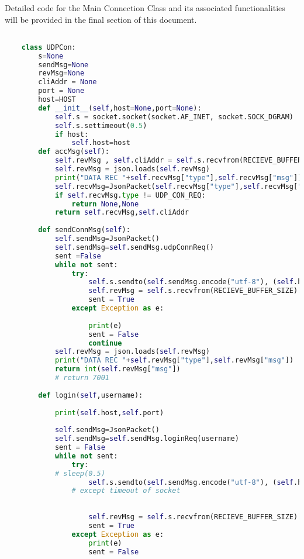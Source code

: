 Detailed code for the Main Connection Class and its associated functionalities will be provided in the final section of this document.
\begin{lstlisting}[language=Python]

    class UDPCon:
        s=None
        sendMsg=None
        revMsg=None
        cliAddr = None
        port = None
        host=HOST
        def __init__(self,host=None,port=None):
            self.s = socket.socket(socket.AF_INET, socket.SOCK_DGRAM)
            self.s.settimeout(0.5)
            if host:
                self.host=host
        def accMsg(self):
            self.revMsg , self.cliAddr = self.s.recvfrom(RECIEVE_BUFFER_SIZE)
            self.revMsg = json.loads(self.revMsg)
            print("DATA REC "+self.recvMsg["type"],self.recvMsg["msg"])
            self.recvMsg=JsonPacket(self.recvMsg["type"],self.recvMsg["msg"])
            if self.recvMsg.type != UDP_CON_REQ:
                return None,None
            return self.recvMsg,self.cliAddr
    
        def sendConnMsg(self):
            self.sendMsg=JsonPacket()
            self.sendMsg=self.sendMsg.udpConnReq()
            sent =False
            while not sent:
                try:
                    self.s.sendto(self.sendMsg.encode("utf-8"), (self.host,PORT))
                    self.revMsg = self.s.recvfrom(RECIEVE_BUFFER_SIZE)[0]
                    sent = True
                except Exception as e:
    
                    print(e)
                    sent = False
                    continue
            self.revMsg = json.loads(self.revMsg)
            print("DATA REC "+self.revMsg["type"],self.revMsg["msg"])
            return int(self.revMsg["msg"])
            # return 7001
    
        def login(self,username):
            
            print(self.host,self.port)
    
            self.sendMsg=JsonPacket()
            self.sendMsg=self.sendMsg.loginReq(username)
            sent = False
            while not sent:
                try:
            # sleep(0.5)
                    self.s.sendto(self.sendMsg.encode("utf-8"), (self.host,self.port))
                # except timeout of socket
                    
            
                    self.revMsg = self.s.recvfrom(RECIEVE_BUFFER_SIZE)[0]
                    sent = True
                except Exception as e:
                    print(e)
                    sent = False
    

\end{lstlisting}

